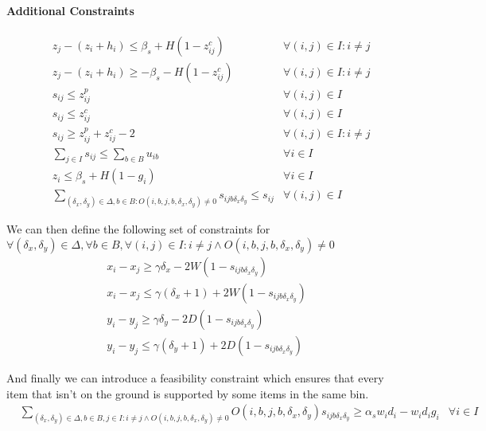 \paragraph*{Additional Constraints}
\begin{eqnarray}
    & z_j - (z_i + h_i) \le \beta_s + H (1 - z^c_{ij}) & \forall (i, j) \in I : i \neq j \label{cons:z_close_1} \\
    & z_j - (z_i + h_i) \ge -\beta_s - H (1 - z^c_{ij}) & \forall (i, j) \in I : i \neq j \label{cons:z_close_2} \\
    & s_{ij} \le z^p_{ij} & \forall (i, j) \in I  \label{cons:supporting_1} \\
    & s_{ij} \le z^c_{ij} & \forall (i, j) \in I  \label{cons:supporting_2} \\
    & s_{ij} \ge z^p_{ij} + z^c_{ij} - 2 & \forall (i, j) \in I : i \neq j \label{cons:supporting} \\
    & \sum\limits_{j \in I}{s_{ij}} \le \sum\limits_{b \in B}{u_{ib}} & \forall i \in I  \label{cons:support_comes_from_placed} \\
    & z_i \le \beta_s + H(1 - g_i) & \forall i \in I \label{cons:grounded} \\
    & \sum\limits_{(\delta_x, \delta_y) \in \Delta, b \in B : O(i, b, j, b, \delta_x, \delta_y) \neq 0} s_{i j b \delta_x \delta_y } \le s_{ij} & \forall (i, j) \in I \label{cons:discretized_support_same}
\end{eqnarray}

We can then define the following set of constraints for $\forall (\delta_x, \delta_y) \in \Delta, \forall b \in B, \forall (i,j) \in I : i \neq j \land O(i, b, j, b, \delta_x, \delta_y) \neq 0$
\begin{eqnarray}
    & x_i - x_j \ge \gamma \delta_x - 2W( 1 - s_{i j b \delta_x \delta_y}) &  \label{cons:discretized_support_limit_x_1} \\
    & x_i - x_j \le \gamma (\delta_x + 1) + 2W( 1 - s_{i j b \delta_x \delta_y}) &  \label{cons:discretized_support_limit_x_2} \\
    & y_i - y_j \ge \gamma \delta_y - 2D( 1 - s_{i j b \delta_x \delta_y}) &  \label{cons:discretized_support_limit_y_1} \\
    & y_i - y_j \le \gamma (\delta_y + 1) + 2D( 1 - s_{i j b \delta_x \delta_y}) &  \label{cons:discretized_support_limit_y_2}
\end{eqnarray}

And finally we can introduce a feasibility constraint which ensures that every item that isn't on the ground is supported by some items in the same bin.
\begin{eqnarray*}
    & \sum\limits_{(\delta_x, \delta_y) \in \Delta, b \in B, j \in I : i \neq j \land O(i, b, j, b, \delta_x, \delta_y) \neq 0}{ O(i, b, j, b, \delta_x, \delta_y)s_{i j b \delta_x \delta_y }} \ge \alpha_s w_i d_i - w_i d_i g_i & \forall i \in I \label{cons:every_item_is_supported}
\end{eqnarray*}